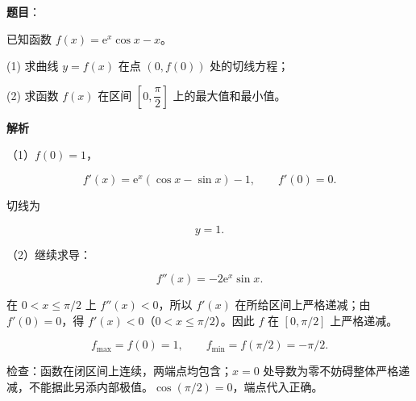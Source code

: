 \begin{answer}

\textbf{题目}：

已知函数 $f(x)=\mathrm e^x\cos x-x$。

(1) 求曲线 $y=f(x)$ 在点 $(0,f(0))$ 处的切线方程；

(2) 求函数 $f(x)$ 在区间 $\left[0,\dfrac\pi2\right]$ 上的最大值和最小值。

\textbf{解析}

（1）$f(0)=1$，

\nopagebreak[4]
\[f'(x)=\mathrm e^x(\cos x-\sin x)-1,\qquad f'(0)=0.\]

切线为

\nopagebreak[4]
\[\boxed{y=1}.\]

（2）继续求导：

\nopagebreak[4]
\[f''(x)=-2\mathrm e^x\sin x.\]

在 $0<x\leqslant\pi/2$ 上 $f''(x)<0$，所以 $f'(x)$ 在所给区间上严格递减；由 $f'(0)=0$，得 $f'(x)<0$（$0<x\leqslant\pi/2$）。因此 $f$ 在 $[0,\pi/2]$ 上严格递减。

\nopagebreak[4]
\[\boxed{f_{\max}=f(0)=1,\qquad f_{\min}=f(\pi/2)=-\pi/2}.\]

检查：函数在闭区间上连续，两端点均包含；$x=0$ 处导数为零不妨碍整体严格递减，不能据此另添内部极值。$\cos(\pi/2)=0$，端点代入正确。



\end{answer}
